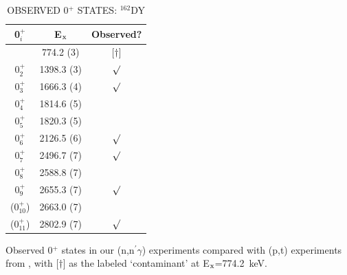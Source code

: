 



\begin{table}[ht]
\begin{center}
\caption{OBSERVED 0$^+$ STATES: $^{162}$DY \label{tab:0s_comparison}}

\begin{tabular}{cc|c}


0$^+_i$ & E$_{\rm x}$ & Observed? \\
\hline
\hline
[$\dagger$] & 774.2 (3) & [$\dagger$] \\
0$^+_2$ & 1398.3 (3) & $\surd$ \\
0$^+_3$ & 1666.3 (4) & $\surd$ \\
0$^+_4$ & 1814.6 (5) &  \\
0$^+_5$ & 1820.3 (5) &  \\
0$^+_6$ & 2126.5 (6) & $\surd$ \\
0$^+_7$ & 2496.7 (7) & $\surd$ \\
0$^+_8$ & 2588.8 (7) &  \\
0$^+_9$ & 2655.3 (7) & $\surd$ \\
(0$^+_{10}$) & 2663.0 (7) & \\
(0$^+_{11}$) & 2802.9 (7) & $\surd$ \\
\end{tabular}
\end{center}
Observed 0$^+$ states in our (n,n$^\prime\gamma$) experiments compared with (p,t) experiments from \cite{Meyer_pt0_2006}, with [$\dagger$] as the labeled `contaminant' at E$_{\rm x}$=774.2~keV.
\end{table}


